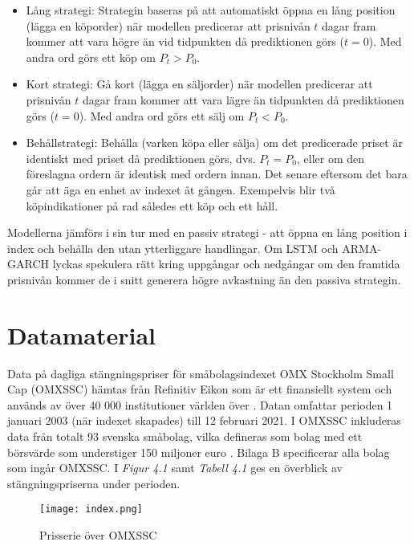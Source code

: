 \documentclass[11pt]{article}
\numberwithin{equation}{section}
\numberwithin{table}{section}
\numberwithin{figure}{section}
\begin{document}
\begin{itemize}
    \item Lång strategi: Strategin baseras på att automatiskt öppna en lång position (lägga en köporder) när modellen predicerar att prisnivån $t$ dagar fram kommer att vara högre än vid tidpunkten då prediktionen görs ($t=0$). Med andra ord görs ett köp om $P_t > P_0$.
    \item Kort strategi: Gå kort (lägga en säljorder) när modellen predicerar att prisnivån $t$ dagar fram kommer att vara lägre än tidpunkten då prediktionen görs ($t=0$). Med andra ord görs ett sälj om $P_t < P_0$.
    \item Behållstrategi: Behålla (varken köpa eller sälja) om det predicerade priset är identiskt med priset då prediktionen görs, dvs. $P_t = P_0$, eller om den föreslagna ordern är identisk med ordern innan. Det senare eftersom det bara går att äga en enhet av indexet åt gången. Exempelvis blir två köpindikationer på rad således ett köp och ett håll.
\end{itemize}

Modellerna jämförs i sin tur med en passiv strategi - att öppna en lång position i index och behålla den utan ytterliggare handlingar. Om LSTM och ARMA-GARCH lyckas spekulera rätt kring uppgångar och nedgångar om den framtida prisnivån kommer de i snitt generera högre avkastning än den passiva strategin. 

\newpage
\section{Datamaterial}

Data på dagliga stängningspriser för småbolagsindexet OMX Stockholm Small Cap (OMXSSC) hämtas från Refinitiv Eikon som är ett finansiellt system och används av över 40 000 institutioner världen över \parencite{Eikon}. Datan omfattar perioden 1 januari 2003 (när indexet skapades) till 12 februari 2021. I OMXSSC inkluderas data från totalt 93 svenska småbolag, vilka defineras som bolag med ett börsvärde som understiger 150 miljoner euro \parencite{smabalagsdefinition}. Bilaga B specificerar alla bolag som ingår OMXSSC. I \emph{Figur 4.1} samt \textit{Tabell 4.1} ges en överblick av stängningspriserna under perioden. 

\begin{figure}[H]
\caption{Prisserie över OMXSSC}
\texttt{[image: index.png]}
\centering
\end{figure}
\end{document}
